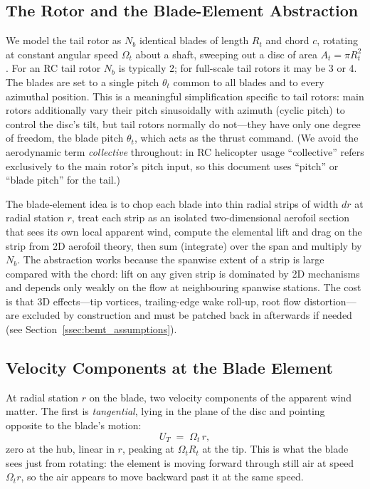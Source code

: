 \documentclass[11pt,a4paper]{article}
\newcommand{\OmegaT}{\Omega_t}
\newcommand{\Rt}{R_t}
\newcommand{\At}{A_t}
\newcommand{\thetat}{\theta_t}
\begin{document}
\subsection{The Rotor and the Blade-Element Abstraction}\label{ssec:abstraction}

We model the tail rotor as \(N_b\) identical blades of length \(\Rt\)
and chord \(c\), rotating at constant angular speed \(\OmegaT\) about a
shaft, sweeping out a disc of area \(\At = \pi\Rt^2\). For an RC tail
rotor \(N_b\) is typically 2; for full-scale tail rotors it may be 3
or 4. The blades are set to a single pitch \(\thetat\) common to all
blades and to every azimuthal position. This is a meaningful
simplification specific to tail rotors: main rotors additionally vary
their pitch sinusoidally with azimuth (cyclic pitch) to control the
disc's tilt, but tail rotors normally do not---they have only one
degree of freedom, the blade pitch \(\thetat\), which acts as the
thrust command. (We avoid the aerodynamic term \emph{collective}
throughout: in RC helicopter usage ``collective'' refers exclusively
to the main rotor's pitch input, so this document uses ``pitch'' or
``blade pitch'' for the tail.)

The blade-element idea is to chop each blade into thin radial strips
of width \(dr\) at radial station \(r\), treat each strip as an
isolated two-dimensional aerofoil section that sees its own local
apparent wind, compute the elemental lift and drag on the strip from
2D aerofoil theory, then sum (integrate) over the span and multiply by
\(N_b\). The abstraction works because the spanwise extent of a strip
is large compared with the chord: lift on any given strip is dominated
by 2D mechanisms and depends only weakly on the flow at neighbouring
spanwise stations. The cost is that 3D effects---tip vortices,
trailing-edge wake roll-up, root flow distortion---are excluded by
construction and must be patched back in afterwards if needed (see
Section~\ref{ssec:bemt_assumptions}).

\subsection{Velocity Components at the Blade Element}\label{ssec:velocity_triangle}

At radial station \(r\) on the blade, two velocity components of the
apparent wind matter. The first is \emph{tangential}, lying in the
plane of the disc and pointing opposite to the blade's motion:
\begin{equation}
U_T \;=\; \OmegaT\,r,
\end{equation}
zero at the hub, linear in \(r\), peaking at \(\OmegaT\Rt\) at the
tip. This is what the blade sees just from rotating: the element is
moving forward through still air at speed \(\OmegaT r\), so the air
appears to move backward past it at the same speed.
\end{document}
